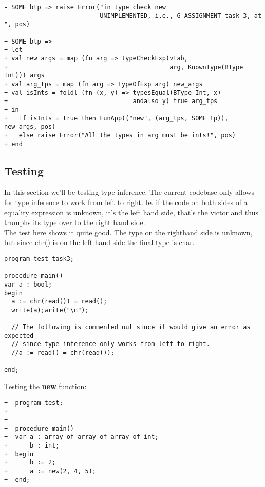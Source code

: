 \begin{lstlisting}[style=MLStyle]
- SOME btp => raise Error("in type check new 
-                         UNIMPLEMENTED, i.e., G-ASSIGNMENT task 3, at ", pos)

+ SOME btp => 
+ let
+ val new_args = map (fn arg => typeCheckExp(vtab,
+                                            arg, KnownType(BType Int))) args
+ val arg_tps = map (fn arg => typeOfExp arg) new_args
+ val isInts = foldl (fn (x, y) => typesEqual(BType Int, x) 
+                                  andalso y) true arg_tps 
+ in
+   if isInts = true then FunApp(("new", (arg_tps, SOME tp)), new_args, pos)
+   else raise Error("All the types in arg must be ints!", pos)
+ end
\end{lstlisting}
\subsection{Testing}
In this section we'll be testing type inference. The current codebase only
allows for type inference to work from left to right. Ie. if the code on both
sides of a equality expression is unknown, it's the left hand side, that's the
victor and thus trumphs its type over to the right hand side.\\
The test here shows it quite good. The type on the righthand side is unknown,
but since chr() is on the left hand side the final type is char.

\begin{verbatim}
program test_task3;

procedure main()
var a : bool;
begin
  a := chr(read()) = read();
  write(a);write("\n");

  // The following is commented out since it would give an error as expected
  // since type inference only works from left to right.
  //a := read() = chr(read());

end;
\end{verbatim}

Testing the \textbf{new} function:

\begin{verbatim}
+  program test;
+  
+  
+  procedure main()
+  var a : array of array of array of int;
+      b : int;
+  begin 
+      b := 2;
+      a := new(2, 4, 5);
+  end;
\end{verbatim}

